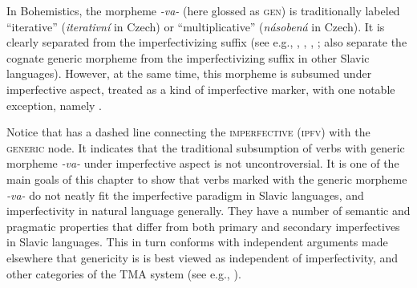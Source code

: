 \documentclass[output=paper,colorlinks,citecolor=brown]{langscibook}
\begin{document}
In Bohemistics, the morpheme \textit{-va-} (here glossed as \textsc{gen}) is traditionally labeled ``iterative'' (\textit{iterativní} in Czech) or ``multiplicative'' (\textit{násobená} in Czech). It is clearly separated from the imperfectivizing suffix (see e.g., \citealt{petr1986mluvnice}, \citealt{lamprecht1986historicka}, \citealt{Kosek2014}, \citealt{biskup2024}; \citealt{Genis2021} also separate the cognate generic morpheme from the imperfectivizing suffix in other Slavic languages).  However, at the same time,
this morpheme is subsumed under imperfective aspect, treated as a kind of imperfective marker, with one notable exception, namely \citet{kopecny1948,kopecny1966}.

Notice that  has a dashed line connecting the \textsc{imperfective (ipfv)}  with the \textsc{generic} node. 
It indicates that the traditional subsumption of verbs with 
generic morpheme \textit{-va-} under imperfective 
aspect is not uncontroversial.  
It is one of the main goals of this chapter to show 
that verbs marked with the generic morpheme \textit{-va-} do not neatly fit the imperfective paradigm in Slavic languages, and imperfectivity in natural language generally.
They have a number of semantic and pragmatic properties that differ from both primary and secondary imperfectives in Slavic languages. This in turn conforms with independent arguments made elsewhere that genericity is is best viewed as independent of imperfectivity, and other categories of the TMA system (see e.g., \citealt{filip1997suigenva}).
\end{document}
